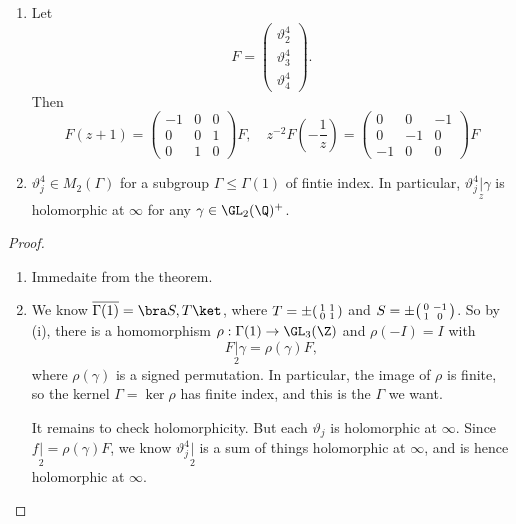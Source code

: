 \documentclass[a4paper]{article}
\begin{document}
\begin{cor}\leavevmode
  \begin{enumerate}
    \item Let
      \[
        F =
        \begin{pmatrix}
          \vartheta_2^4\\
          \vartheta_3^4\\
          \vartheta_4^4
        \end{pmatrix}.
      \]
      Then
      \[
        F(z + 1) =
        \begin{pmatrix}
           -1 & 0 & 0\\
           0 & 0 & 1\\
           0 & 1 & 0
         \end{pmatrix} F,\quad z^{-2} F\left(-\frac{1}{z}\right) =
         \begin{pmatrix}
           0 & 0 & -1\\
           0 & -1 & 0\\
           -1 & 0 & 0
         \end{pmatrix}F
      \]
    \item $\vartheta_j^4 \in M_2(\Gamma)$ for a subgroup $\Gamma \leq \Gamma(1)$ of fintie index. In particular, $\vartheta_j^4 \underset{z}{|} \gamma$ is holomorphic at $\infty$ for any $\gamma \in \GL_2(\Q)^+$.
  \end{enumerate}
\end{cor}
\begin{proof}\leavevmode
  \begin{enumerate}
    \item Immedaite from the theorem.
    \item We know $\overline{\Gamma(1)} = \bra S, T\ket$, where $T = \pm \begin{psmallmatrix}1 & 1\\0 & 1\end{psmallmatrix}$ and $S = \pm \begin{psmallmatrix}0 & -1\\1 & 0\end{psmallmatrix}$. So by (i), there is a homomorphism $\rho: \Gamma(1) \to \GL_3(\Z)$ and $\rho(-I) = I$ with
      \[
        F\underset{2}{|} \gamma = \rho(\gamma) F,
      \]
      where $\rho(\gamma)$ is a signed permutation. In particular, the image of $\rho$ is finite, so the kernel $\Gamma = \ker \rho$ has finite index, and this is the $\Gamma$ we want.

      It remains to check holomorphicity. But each $\vartheta_j$ is holomorphic at $\infty$. Since $f\underset{2}{|}= \rho (\gamma) F$, we know $\vartheta_j^4\underset{2}{|}$ is a sum of things holomorphic at $\infty$, and is hence holomorphic at $\infty$.
  \end{enumerate}
\end{proof}
\end{document}
